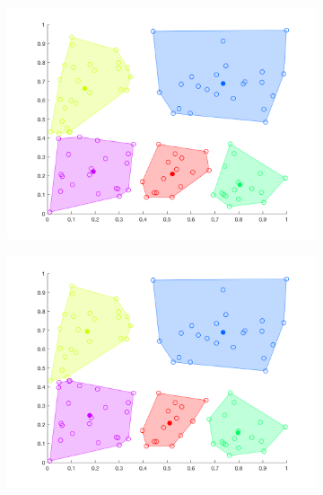 \documentclass[12pt]{article}
\begin{document}
\begin{figure}[t!]
\begin{subfigure}[b]{0.25\textwidth}
    \end{subfigure}
    \begin{subfigure}[b]{0.25\textwidth}
        \includegraphics[width=\textwidth]{k-means_6}
    \end{subfigure}
    \begin{subfigure}[b]{0.25\textwidth}
        \includegraphics[width=\textwidth]{k-means_7}
    \end{subfigure}
    \begin{subfigure}[b]{0.25\textwidth}

\end{subfigure}
\end{figure}
\end{document}
